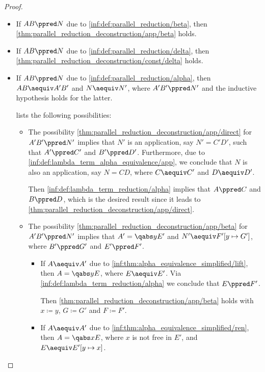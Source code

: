 \begin{proof}
\begin{itemize}
    \item If \( AB \ppred N \) due to \ref{inf:def:parallel_reduction/beta}, then \ref{thm:parallel_reduction_deconstruction/app/beta} holds.

    \item If \( AB \ppred N \) due to \ref{inf:def:parallel_reduction/delta}, then \ref{thm:parallel_reduction_deconstruction/const/delta} holds.

    \item If \( AB \ppred N \) due to \ref{inf:def:parallel_reduction/alpha}, then \( AB \aequiv A' B' \) and \( N \aequiv N' \), where \( A' B' \ppred N' \) and the inductive hypothesis holds for the latter.

     lists the following possibilities:
    \begin{itemize}
      \item The possibility \ref{thm:parallel_reduction_deconstruction/app/direct} for \( A' B' \ppred N' \) implies that \( N' \) is an application, say \( N' = C' D' \), such that \( A' \ppred C' \) and \( B' \ppred D' \). Furthermore, due to \ref{inf:def:lambda_term_alpha_equivalence/app}, we conclude that \( N \) is also an application, say \( N = CD \), where \( C \aequiv C' \) and \( D \aequiv D' \).

      Then \ref{inf:def:lambda_term_reduction/alpha} implies that \( A \ppred C \) and \( B \ppred D \), which is the desired result since it leads to \ref{thm:parallel_reduction_deconstruction/app/direct}.

      \item The possibility \ref{thm:parallel_reduction_deconstruction/app/beta} for \( A' B' \ppred N' \) implies that \( A' = \qabs y E' \) and \( N' \aequiv F'[y \mapsto G'] \), where \( B' \ppred G' \) and \( E' \ppred F' \).

      \begin{itemize}
        \item If \( A \aequiv A' \) due to \ref{inf:thm:alpha_equivalence_simplified/lift}, then \( A = \qabs y E \), where \( E \aequiv E' \). Via \ref{inf:def:lambda_term_reduction/alpha} we conclude that \( E \ppred F' \).

        Then \ref{thm:parallel_reduction_deconstruction/app/beta} holds with \( x \coloneqq y \), \( G \coloneqq G' \) and \( F \coloneqq F' \).

        \item If \( A \aequiv A' \) due to \ref{inf:thm:alpha_equivalence_simplified/ren}, then \( A = \qabs x E \), where \( x \) is not free in \( E' \), and \( E \aequiv E'[y \mapsto x] \).


\end{itemize}
\end{itemize}
\end{itemize}
\end{proof}
